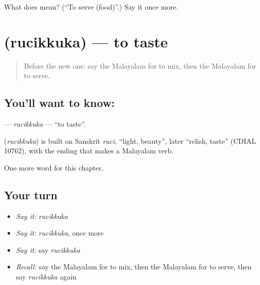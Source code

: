 \begin{tcolorbox}[breakable,colback=teal!4,colframe=teal!35!black,title={Before you move on}]
What does  mean? (\textquotedblleft{}To serve (food)\textquotedblright{}.) Say it once more.
\end{tcolorbox}
\section[\texorpdfstring{\ml{രുചിക്കുക} (rucikkuka)}{രുചിക്കുക (rucikkuka)}]{ (rucikkuka) — to taste}

\label{lesson:ML-C224-rucikkuka}



\begin{quote}
Before the new one: say the Malayalam for to mix, then the Malayalam for to serve.
\end{quote}

\subsection*{You'll want to know: }
\textbf{} — \emph{rucikkuka} — \textquotedblleft{}to taste\textquotedblright{}.

\begin{cousinweb}
\textbf{} (\emph{rucikkuka}) is built on Sanskrit \emph{ruci}, \textquotedblleft{}light, beauty\textquotedblright{}, later \textquotedblleft{}relish, taste\textquotedblright{} (CDIAL 10762), with the ending that makes a Malayalam verb.
\end{cousinweb}

\begin{grammarlens}[title={What you've built}]
One more word for this chapter.
\end{grammarlens}

\subsection*{Your turn}
\begin{itemize}
\raggedright
  \item \emph{Say it:} \emph{rucikkuka}
  \item \emph{Say it:} \emph{rucikkuka}, once more
  \item \emph{Say it:} say \emph{rucikkuka}
  \item \emph{Recall:} say the Malayalam for to mix, then the Malayalam for to serve, then say \emph{rucikkuka} again
\end{itemize}

